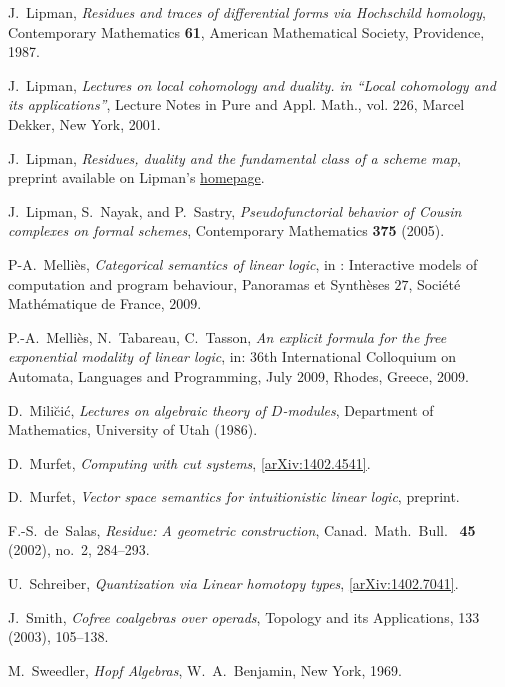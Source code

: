 \documentclass[english,letter paper,12pt,reqno]{article}
\theoremstyle{example}
\numberwithin{equation}{section}
\begin{document}
\begin{thebibliography}{BHLS03}
J.~Lipman, \textsl{Residues and traces of differential forms via {H}ochschild
  homology}, Contemporary Mathematics \textbf{61}, American Mathematical Society,
  Providence, 1987.

J.~Lipman, \emph{Lectures on local cohomology and duality. in ``{L}ocal cohomology
  and its applications''}, Lecture Notes in Pure and Appl. Math., vol. 226,
  Marcel Dekker, New York, 2001.

J.~Lipman, \textsl{Residues, duality and the fundamental class of a scheme map}, preprint available on Lipman's \href{http://www.math.purdue.edu/~Lipman/papers/Algecom.pdf}{homepage}.

J.~Lipman, S.~Nayak, and P.~Sastry, \emph{Pseudofunctorial behavior of {C}ousin
  complexes on formal schemes}, Contemporary Mathematics \textbf{375} (2005).

P-A.~Melli\`{e}s, \textsl{Categorical semantics of linear logic}, in : Interactive models of computation and program behaviour, Panoramas et Synth\`{e}ses $27$, Soci\'{e}t\'{e} Math\'{e}matique de France, $2009$.

P.-A.~Melli\`{e}s, N.~Tabareau, C.~Tasson, \textsl{An explicit formula for the free exponential modality of linear logic}, in: 36th International Colloquium on Automata, Languages and Programming, July 2009, Rhodes, Greece, 2009.

D.~Mili\u{c}i\'{c}, \textsl{Lectures on algebraic theory of $D$-modules}, Department of Mathematics, University of Utah (1986).

D.~Murfet, \textsl{Computing with cut systems}, \href{http://arxiv.org/abs/1402.4541}{[arXiv:1402.4541]}.

D.~Murfet, \textsl{Vector space semantics for intuitionistic linear logic}, preprint.

F.-S.~de~Salas, \textsl{Residue: A geometric construction}, Canad.~Math.~Bull.~
  \textbf{45} (2002), no.~2, 284--293.

U.~Schreiber, \textsl{Quantization via {L}inear homotopy types}, \href{http://arxiv.org/abs/1402.7041}{[arXiv:1402.7041]}.
  
J.~Smith, \textsl{Cofree coalgebras over operads}, Topology and its Applications, 133 (2003), 105--138.

M.~Sweedler, \textsl{Hopf Algebras}, W.~A.~Benjamin, New York, 1969.

\end{thebibliography}
\end{document}
